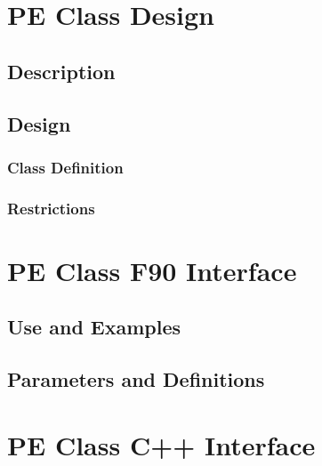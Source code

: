 \documentclass[]{article}
\begin{document}
\section{PE Class Design}

\subsection{Description}




\subsection{Design}




\subsubsection{Class Definition}




\subsubsection{Restrictions}

%


\section{PE Class F90 Interface}

\subsection{Use and Examples}

%


\subsection{Parameters and Definitions}

%



%


\section{PE Class C++ Interface}
\end{document}
